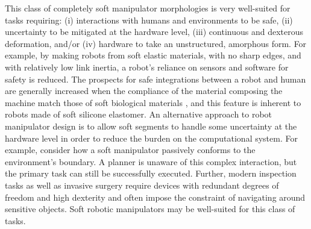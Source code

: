 This class of completely soft manipulator morphologies is very well-suited for tasks requiring: (i) interactions with humans and environments to be safe, (ii) uncertainty to be mitigated at the hardware level, (iii) continuous and dexterous deformation, and/or (iv) hardware to take an unstructured, amorphous form.
%
For example, by making robots from soft elastic materials, with no sharp edges, and with relatively low link inertia, a robot's reliance on sensors and software for safety is reduced.
%
The prospects for safe integrations between a robot and human are generally increased when the compliance of the material composing the machine match those of soft biological materials \citet{majidi2014soft}, and this feature is inherent to robots made of soft silicone elastomer.
%
An alternative approach to robot manipulator design is to allow soft segments to handle some uncertainty at the hardware level in order to reduce the burden on the computational system.
%
For example, consider how a soft manipulator passively conforms to the environment's boundary. A planner is unaware of this complex interaction, but the primary task can still be successfully executed.
%
Further, modern inspection tasks as well as invasive surgery require devices with redundant degrees of freedom and high dexterity and often impose the constraint of navigating around sensitive objects.
%
Soft robotic manipulators may be well-suited for this class of tasks.

